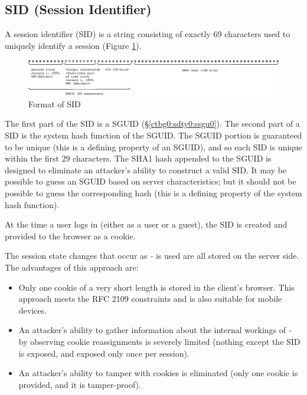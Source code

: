 \subsection{SID (Session Identifier)}
\label{ctbg0:sdty0:ssid0}

A session identifier (SID) is a
string consisting of exactly 69 characters used to uniquely
identify a session (Figure \ref{fig:ctbg0:sdty0:ssid0:00}).

\begin{figure}
\centering
\includegraphics[width=4.6in]{c_tbg0/sidformat01.eps}
\caption{Format of SID}
\label{fig:ctbg0:sdty0:ssid0:00}
\end{figure}

The first part of the SID is a SGUID 
(\S{}\ref{ctbg0:sdty0:ssgu0}).  The second part of a SID is
the system hash function of the SGUID.  The SGUID portion is guaranteed to
be unique (this is a defining property of an SGUID),
and so each SID is unique within the first 29 characters.
The SHA1 hash appended to the SGUID is designed to eliminate an attacker's
ability to construct a valid SID.  It may be possible to guess an SGUID based
on server characteristics; but it should not be possible to guess the corresponding
hash (this is a defining property of the system hash function).

At the time a user logs in (either as a user or a guest), the SID is created
and provided to the browser as a cookie.

The session state changes that occur as \emph{\productbasename{}-\productversion{}}
is used are all stored on the server side.  The advantages of this approach
are:

\begin{itemize}
\item Only one cookie of a very short length is stored in the client's browser.
      This approach meets the RFC 2109 constraints and is also suitable
      for mobile devices.
\item An attacker's ability to gather information about the internal workings
      of \emph{\productbasename{}-\productversion{}} by
      observing cookie reassignments is severely limited
      (nothing except the SID is exposed, and exposed only once per session).
\item An attacker's ability to tamper with cookies is eliminated (only one
      cookie is provided, and it is tamper-proof).       
\end{itemize}


